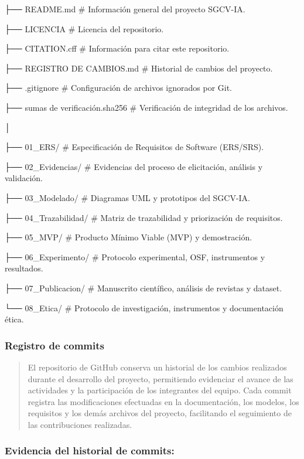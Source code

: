 \documentclass[
]{article}
\begin{document}
├── README.md \# Información general del proyecto SGCV-IA.

├── LICENCIA \# Licencia del repositorio.

├── CITATION.cff \# Información para citar este repositorio.

├── REGISTRO DE CAMBIOS.md \# Historial de cambios del proyecto.

├── .gitignore \# Configuración de archivos ignorados por Git.

├── sumas de verificación.sha256 \# Verificación de integridad de los
archivos.

│

├── 01\_ERS/ \# Especificación de Requisitos de Software (ERS/SRS).

├── 02\_Evidencias/ \# Evidencias del proceso de elicitación, análisis y
validación.

├── 03\_Modelado/ \# Diagramas UML y prototipos del SGCV-IA.

├── 04\_Trazabilidad/ \# Matriz de trazabilidad y priorización de
requisitos.

├── 05\_MVP/ \# Producto Mínimo Viable (MVP) y demostración.

├── 06\_Experimento/ \# Protocolo experimental, OSF, instrumentos y
resultados.

├── 07\_Publicacion/ \# Manuscrito científico, análisis de revistas y
dataset.

└── 08\_Etica/ \# Protocolo de investigación, instrumentos y
documentación ética.

\subsubsection{Registro de commits}\label{registro-de-commits}

\begin{quote}
El repositorio de GitHub conserva un historial de los cambios realizados
durante el desarrollo del proyecto, permitiendo evidenciar el avance de
las actividades y la participación de los integrantes del equipo. Cada
commit registra las modificaciones efectuadas en la documentación, los
modelos, los requisitos y los demás archivos del proyecto, facilitando
el seguimiento de las contribuciones realizadas.
\end{quote}

\subsubsection{Evidencia del historial de
commits:}\label{evidencia-del-historial-de-commits}
\end{document}
